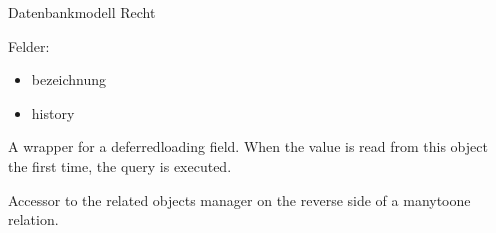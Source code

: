 \documentclass[letterpaper,10pt,english]{sphinxmanual}
\begin{document}
\begin{fulllineitems}
\label{\detokenize{masterCodeDoc:aemter.models.Recht}}
Datenbankmodell Recht

Felder:
\begin{itemize}
\item {} 
bezeichnung

\item {} 
history

\end{itemize}

\begin{fulllineitems}
\label{\detokenize{masterCodeDoc:aemter.models.Recht.DoesNotExist}}
\end{fulllineitems}


\begin{fulllineitems}
\label{\detokenize{masterCodeDoc:aemter.models.Recht.MultipleObjectsReturned}}
\end{fulllineitems}


\begin{fulllineitems}
\label{\detokenize{masterCodeDoc:aemter.models.Recht.bezeichnung}}
A wrapper for a deferred\sphinxhyphen{}loading field. When the value is read from this
object the first time, the query is executed.

\end{fulllineitems}


\begin{fulllineitems}
\label{\detokenize{masterCodeDoc:aemter.models.Recht.checklisterecht_set}}
Accessor to the related objects manager on the reverse side of a
many\sphinxhyphen{}to\sphinxhyphen{}one relation.


\end{fulllineitems}
\end{fulllineitems}
\end{document}
